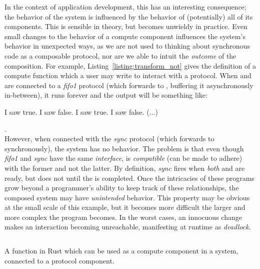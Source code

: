 In the context of application development, this has an interesting consequence; the behavior of the system is influenced by the behavior of (potentially) all of its components. This is sensible in theory, but becomes unwieldy in practice. Even small changes to the behavior of a compute component influences the system's behavior in unexpected ways, as we are not used to thinking about synchronous code as a composable protocol, nor are we able to intuit the \textit{outcome} of the composition. For example, Listing~\ref{listing:transform_not} gives the definition of a compute function which a user may write to interact with a protocol. When  and  are connected to a \textit{fifo1} protocol (which forwards  to , buffering it asynchronously in-between), it runs forever and the output will be something like:
\begin{verb}
	I saw true. I saw false. I saw true. I saw false. (...)
\end{verb}.\\However, when connected with the \textit{sync} protocol (which forwards  to  synchronously), the system has no behavior. The problem is that even though \textit{fifo1} and \textit{sync} have the same \textit{interface},  is \textit{compatible} (can be made to adhere) with the former and not the latter. By definition, \textit{sync} fires when \textit{both}  and  are ready, but  does not  until the  is completed. Once the intricacies of these programs grow beyond a programmer's ability to keep track of these relationships, the composed system may have \textit{unintended} behavior. This property may be obvious at the small scale of this example, but it becomes more difficult the larger and more complex the program becomes. In the worst cases, an innocuous change makes an interaction becoming unreachable, manifesting at runtime as \textit{deadlock}. 


\begin{listing}[ht]
	\inputminted[]{rust}{transform_not.rs}
	\caption[Rust example of a compute component.]{A function in Rust which can be used as a compute component in a system, connected to a protocol component.}
	\label{listing:transform_not}
\end{listing}


%
%

